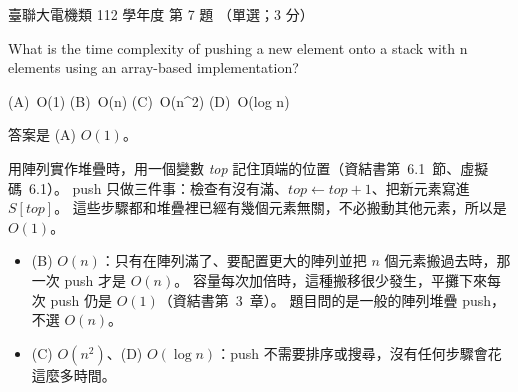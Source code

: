 \begin{pastexam}[label={px:ust-112-ee-ds-07}]{臺聯大電機類 112 學年度 第 7 題}
（單選；3 分）

What is the time complexity of pushing a new element onto a stack with n elements using an
array-based implementation?

(A)~O(1) \qquad (B)~O(n) \qquad (C)~O(n\^{}2) \qquad (D)~O(log n)
\end{pastexam}

\begin{pastsoln}
答案是 (A) $O(1)$。

用陣列實作堆疊時，用一個變數 \textit{top} 記住頂端的位置（資結書第~6.1~節、虛擬碼~6.1）。
push 只做三件事：檢查有沒有滿、$\mathit{top} \gets \mathit{top} + 1$、把新元素寫進
$S[\mathit{top}]$。 這些步驟都和堆疊裡已經有幾個元素無關，不必搬動其他元素，所以是 $O(1)$。

\begin{itemize}
\item (B) $O(n)$：只有在陣列滿了、要配置更大的陣列並把 $n$ 個元素搬過去時，那一次 push 才是
$O(n)$。 容量每次加倍時，這種搬移很少發生，平攤下來每次 push 仍是 $O(1)$（資結書第~3~章）。
題目問的是一般的陣列堆疊 push，不選 $O(n)$。
\item (C) $O(n^2)$、(D) $O(\log n)$：push 不需要排序或搜尋，沒有任何步驟會花這麼多時間。
\end{itemize}
\end{pastsoln}
